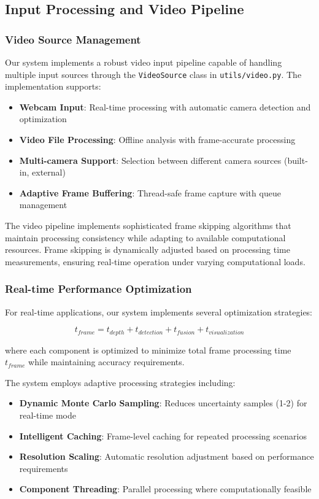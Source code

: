 \documentclass[10pt]{article}
\begin{document}
\subsection{Input Processing and Video Pipeline}

\subsubsection{Video Source Management}

Our system implements a robust video input pipeline capable of handling multiple input sources through the \texttt{VideoSource} class in \texttt{utils/video.py}. The implementation supports:

\begin{itemize}
\item \textbf{Webcam Input}: Real-time processing with automatic camera detection and optimization
\item \textbf{Video File Processing}: Offline analysis with frame-accurate processing
\item \textbf{Multi-camera Support}: Selection between different camera sources (built-in, external)
\item \textbf{Adaptive Frame Buffering}: Thread-safe frame capture with queue management
\end{itemize}

The video pipeline implements sophisticated frame skipping algorithms that maintain processing consistency while adapting to available computational resources. Frame skipping is dynamically adjusted based on processing time measurements, ensuring real-time operation under varying computational loads.

\subsubsection{Real-time Performance Optimization}

For real-time applications, our system implements several optimization strategies:

\begin{equation}
t_{frame} = t_{depth} + t_{detection} + t_{fusion} + t_{visualization}
\label{eq:frame_timing}
\end{equation}

where each component is optimized to minimize total frame processing time $t_{frame}$ while maintaining accuracy requirements.

The system employs adaptive processing strategies including:
\begin{itemize}
\item \textbf{Dynamic Monte Carlo Sampling}: Reduces uncertainty samples (1-2) for real-time mode
\item \textbf{Intelligent Caching}: Frame-level caching for repeated processing scenarios
\item \textbf{Resolution Scaling}: Automatic resolution adjustment based on performance requirements
\item \textbf{Component Threading}: Parallel processing where computationally feasible
\end{itemize}
\end{document}
